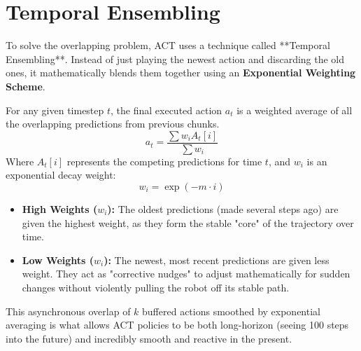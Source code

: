 \documentclass[11pt,a4paper]{article}
\begin{document}
\section{Temporal Ensembling}
To solve the overlapping problem, ACT uses a technique called **Temporal Ensembling**. Instead of just playing the newest action and discarding the old ones, it mathematically blends them together using an \textbf{Exponential Weighting Scheme}.

For any given timestep $t$, the final executed action $a_t$ is a weighted average of all the overlapping predictions from previous chunks.
\[ a_t = \frac{\sum w_i A_t[i]}{\sum w_i} \]
Where $A_t[i]$ represents the competing predictions for time $t$, and $w_i$ is an exponential decay weight:
\[ w_i = \exp(-m \cdot i) \]
\begin{itemize}
    \item \textbf{High Weights ($w_i$):} The oldest predictions (made several steps ago) are given the highest weight, as they form the stable "core" of the trajectory over time.
    \item \textbf{Low Weights ($w_i$):} The newest, most recent predictions are given less weight. They act as "corrective nudges" to adjust mathematically for sudden changes without violently pulling the robot off its stable path.
\end{itemize}

This asynchronous overlap of $k$ buffered actions smoothed by exponential averaging is what allows ACT policies to be both long-horizon (seeing 100 steps into the future) and incredibly smooth and reactive in the present.
\end{document}
